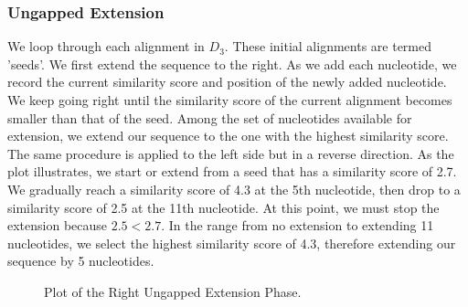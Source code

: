 \documentclass{article}
\begin{document}
\subsubsection*{Ungapped Extension}
We loop through each alignment in $D_3$. These initial alignments are termed 'seeds'. We first extend the sequence to the right. As we add each nucleotide, we record the current similarity score and position of the newly added nucleotide. We keep going right until the similarity score of the current alignment becomes smaller than that of the seed. Among the set of nucleotides available for extension, we extend our sequence to the one with the highest similarity score. The same procedure is applied to the left side but in a reverse direction. As the plot illustrates, we start or extend from a seed that has a similarity score of 2.7. We gradually reach a similarity score of 4.3 at the 5th nucleotide, then drop to a similarity score of 2.5 at the 11th nucleotide. At this point, we must stop the extension because $2.5<2.7$. In the range from no extension to extending 11 nucleotides, we select the highest similarity score of 4.3, therefore extending our sequence by 5 nucleotides.\\

\begin{figure}[htbp]
\centering
{}
\caption{Plot of the Right Ungapped Extension Phase.}
\label{fig:ungappedextension}
\end{figure}
\end{document}
